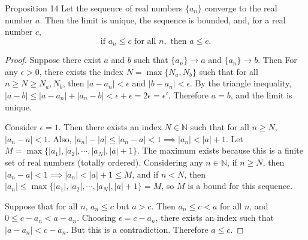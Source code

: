 \documentclass[a4paper,10pt]{book}
\theoremstyle{plain} %
\newcommand{\thistheoremname}{}
\newtheorem*{genericthm*}{\thistheoremname}
\newenvironment{namedthm*}[1]
	{\renewcommand{\thistheoremname}{#1}%
	\begin{genericthm*}}
	{\end{genericthm*}}
\begin{document}
\begin{namedthm*}{Proposition 14}
Let the sequence of real numbers $\{a_n\}$ converge to the real number $a$. 
Then the limit is unique, the sequence is bounded, and, for a real number $c$, 
\[
\text{if } a_n \le c \text{ for all } n, \text{ then } a\le c.	
\]	
\end{namedthm*}
\begin{proof}
	Suppose there exist $a$ and $b$ such that $\{a_n\}\to a$ and $\{a_n\}\to b$.
	Then For any $\epsilon >0$, there exists the index $N = \max \{N_a,N_b\}$ such that for all $n \ge N \ge N_a,N_b$, then $|a-a_n| < \epsilon$ and $|b-a_n| < \epsilon$.
	By the triangle inequality, $|a-b| \le |a-a_n| + |a_n-b| < \epsilon + \epsilon = 2 \epsilon = \epsilon ' $.
	Therefore $a=b$, and the limit is unique. \par
	Consider $\epsilon =1$. Then there exists an index $N \in \mathbb{N}$ such that for all $n \ge N$, $|a_n-a| < 1$.
	Also, $|a_n|-|a| \le |a_n-a| <1\implies |a_n| < |a| +1$.
	Let $M = \max \{|a_1|, |a_2|, \cdots, |a_N|, |a|+1 \}$. The maximum exists because this is a finite set of real numbers (totally ordered).
	Considering any $n \in \mathbb{N}$, if $n \ge N$, then $|a_n-a| <1\implies |a_n| < |a| +1 \le M$, and if $n<N$, then $|a_n| \le \max \{|a_1|, |a_2|, \cdots, |a_N|, |a|+1 \} =M$, so $M$ is a bound for this sequence.
	\par
	Suppose that for all $n$, $a_n \le c$ but $a>c$. 
	Then $a_n \le c < a$ for all $n$, and $0 \le c-a_n <a-a_n$.
	Choosing $\epsilon = c-a_n$, there exists an index such that $|a-a_n| < c-a_n$. But this is a contradiction. 
	Therefore $a \le c$.
\end{proof}
\end{document}
